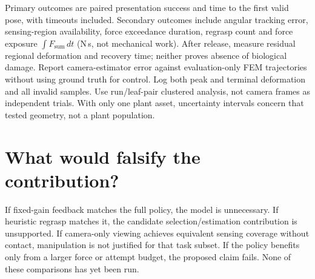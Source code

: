 \documentclass[letterpaper,10pt,conference]{ieeeconf}
\begin{document}
Primary outcomes are paired presentation success and time to the first valid pose, with
timeouts included. Secondary outcomes include angular tracking error, sensing-region
availability, force exceedance duration, regrasp count and force exposure
$\int F_{\mathrm{sum}}\,dt$ (N\,s, not mechanical work). After release, measure residual
regional deformation and recovery time; neither proves absence of biological damage.
Report camera-estimator error against evaluation-only FEM trajectories without using
ground truth for control. Log both peak and terminal deformation and all invalid samples.
Use run/leaf-pair clustered analysis, not camera frames as independent trials. With only
one plant asset, uncertainty intervals concern that tested geometry, not a plant population.

\section{What would falsify the contribution?}
If fixed-gain feedback matches the full policy, the model is unnecessary. If heuristic
regrasp matches it, the candidate selection/estimation contribution is unsupported. If
camera-only viewing achieves equivalent sensing coverage without contact, manipulation
is not justified for that task subset. If the policy benefits only from a larger force or
attempt budget, the proposed claim fails. None of these comparisons has yet been run.



\end{document}
